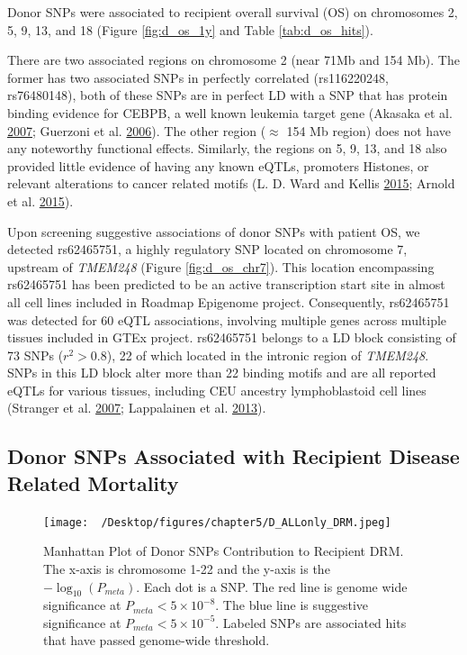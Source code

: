 \documentclass[]{DissertateOSU}
\begin{document}
Donor SNPs were associated to recipient overall survival (OS) on
chromosomes 2, 5, 9, 13, and 18 (Figure \ref{fig:d_os_1y} and Table
\ref{tab:d_os_hits}).

There are two associated regions on chromosome 2 (near 71Mb and 154 Mb).
The former has two associated SNPs in perfectly correlated (rs116220248,
rs76480148), both of these SNPs are in perfect LD with a SNP that has
protein binding evidence for CEBPB, a well known leukemia target gene
(Akasaka et al. \protect\hyperlink{ref-Akasaka_2007}{2007}; Guerzoni et
al. \protect\hyperlink{ref-Guerzoni_2006}{2006}). The other region
(\(\approx\) 154 Mb region) does not have any noteworthy functional
effects. Similarly, the regions on 5, 9, 13, and 18 also provided little
evidence of having any known eQTLs, promoters Histones, or relevant
alterations to cancer related motifs (L. D. Ward and Kellis
\protect\hyperlink{ref-haploreg}{2015}; Arnold et al.
\protect\hyperlink{ref-snipa}{2015}).

Upon screening suggestive associations of donor SNPs with patient OS, we
detected rs62465751, a highly regulatory SNP located on chromosome 7,
upstream of \emph{TMEM248} (Figure \ref{fig:d_os_chr7}). This location
encompassing rs62465751 has been predicted to be an active transcription
start site in almost all cell lines included in Roadmap Epigenome
project. Consequently, rs62465751 was detected for 60 eQTL associations,
involving multiple genes across multiple tissues included in GTEx
project. rs62465751 belongs to a LD block consisting of 73 SNPs
(\(r^2>0.8\)), 22 of which located in the intronic region of
\emph{TMEM248}. SNPs in this LD block alter more than 22 binding motifs
and are all reported eQTLs for various tissues, including CEU ancestry
lymphoblastoid cell lines (Stranger et al.
\protect\hyperlink{ref-stranger_2007}{2007}; Lappalainen et al.
\protect\hyperlink{ref-Lappalainen_2013}{2013}).

\subsection{Donor SNPs Associated with Recipient Disease Related
Mortality}\label{donor-snps-associated-with-recipient-disease-related-mortality}

\begin{figure}
    \centering
    \texttt{[image: ~/Desktop/figures/chapter5/D\_ALLonly\_DRM.jpeg]}
    \caption[Manhattan Plot of Donor SNPs Contribution to Recipient DRM. ]{Manhattan Plot of Donor SNPs Contribution to Recipient DRM. The x-axis is chromosome 1-22 and the y-axis is the $-\log_{10}(P_{meta})$. Each dot is a SNP. The red line is genome wide significance at $P_{meta} < 5\times{10}^{-8}$. The blue line is suggestive significance at $P_{meta} <  5\times{10}^{-5}$. Labeled SNPs are associated hits that have passed genome-wide threshold.}
    \label{fig:d_drm_1y}  
\end{figure}
\end{document}
